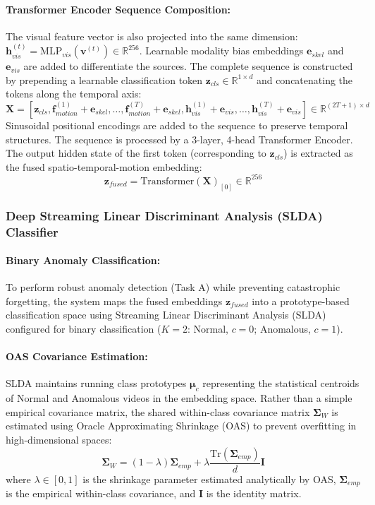 \documentclass[12pt]{article}
\begin{document}
\paragraph{Transformer Encoder Sequence Composition:}
The visual feature vector is also projected into the same dimension: $\mathbf{h}_{vis}^{(t)} = \text{MLP}_{vis}(\mathbf{v}^{(t)}) \in \mathbb{R}^{256}$. Learnable modality bias embeddings $\mathbf{e}_{skel}$ and $\mathbf{e}_{vis}$ are added to differentiate the sources. The complete sequence is constructed by prepending a learnable classification token $\mathbf{z}_{cls} \in \mathbb{R}^{1 \times d}$ and concatenating the tokens along the temporal axis:
\[
\mathbf{X} = [\mathbf{z}_{cls}, \mathbf{f}_{motion}^{(1)} + \mathbf{e}_{skel}, \ldots, \mathbf{f}_{motion}^{(T)} + \mathbf{e}_{skel}, \mathbf{h}_{vis}^{(1)} + \mathbf{e}_{vis}, \ldots, \mathbf{h}_{vis}^{(T)} + \mathbf{e}_{vis}] \in \mathbb{R}^{(2T+1) \times d}
\]
Sinusoidal positional encodings are added to the sequence to preserve temporal structures. The sequence is processed by a 3-layer, 4-head Transformer Encoder. The output hidden state of the first token (corresponding to $\mathbf{z}_{cls}$) is extracted as the fused spatio-temporal-motion embedding:
\[
\mathbf{z}_{fused} = \text{Transformer}(\mathbf{X})_{[0]} \in \mathbb{R}^{256}
\]

\subsubsection{Deep Streaming Linear Discriminant Analysis (SLDA) Classifier}

\paragraph{Binary Anomaly Classification:}
To perform robust anomaly detection (Task A) while preventing catastrophic forgetting, the system maps the fused embeddings $\mathbf{z}_{fused}$ into a prototype-based classification space using Streaming Linear Discriminant Analysis (SLDA) configured for binary classification ($K=2$: Normal, $c=0$; Anomalous, $c=1$).

\paragraph{OAS Covariance Estimation:}
SLDA maintains running class prototypes $\boldsymbol{\mu}_c$ representing the statistical centroids of Normal and Anomalous videos in the embedding space. Rather than a simple empirical covariance matrix, the shared within-class covariance matrix $\mathbf{\Sigma}_W$ is estimated using Oracle Approximating Shrinkage (OAS) to prevent overfitting in high-dimensional spaces:
\[
\mathbf{\Sigma}_{W} = (1 - \lambda)\mathbf{\Sigma}_{emp} + \lambda \frac{\text{Tr}(\mathbf{\Sigma}_{emp})}{d} \mathbf{I}
\]
where $\lambda \in [0, 1]$ is the shrinkage parameter estimated analytically by OAS, $\mathbf{\Sigma}_{emp}$ is the empirical within-class covariance, and $\mathbf{I}$ is the identity matrix.
\end{document}
